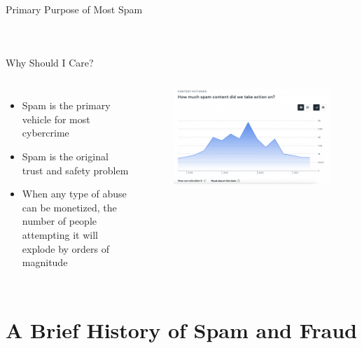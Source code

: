 \documentclass[nobackground,dvipsnames,table,aspectratio=169]{beamer}
\begin{document}
\begin{frame}{Primary Purpose of Most Spam}
\begin{columns}
\begin{figure}
            \end{figure}
    \end{columns}
\end{frame}

\begin{frame}{Why Should I Care?}
    \begin{columns}
            \begin{itemize}
                \item Spam is the primary vehicle for most cybercrime
                \item Spam is the original trust and safety problem
                \item When any type of abuse can be monetized, the number of people attempting it will explode by orders of magnitude
            \end{itemize}
            \begin{figure}
                \centering
                \includegraphics[width=\textwidth]{spam-content-removed}
            \end{figure}
    \end{columns}
\end{frame}

\section{A Brief History of Spam and Fraud}
\end{document}
